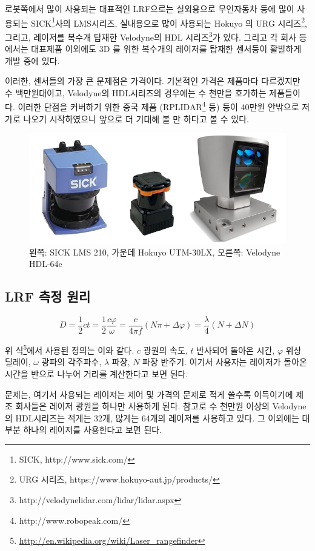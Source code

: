 로봇쪽에서 많이 사용되는 대표적인 LRF으로는 실외용으로 무인자동차 등에 많이 사용되는 SICK\footnote{SICK, http://www.sick.com/}사의 LMS시리즈, 실내용으로 많이 사용되는 Hokuyo 의 URG 시리즈\footnote{URG 시리즈, https://www.hokuyo-aut.jp/products/}, 그리고, 레이저를 복수개 탑재한 Velodyne의 HDL 시리즈\footnote{http://velodynelidar.com/lidar/lidar.aspx}가 있다. 그리고 각 회사 등에서는 대표제품 이외에도 3D 를 위한 복수개의 레이저를 탑재한 센서등이 활발하게 개발 중에 있다.

이러한, 센서들의 가장 큰 문제점은 가격이다. 기본적인 가격은 제품마다 다르겠지만 수 백만원대이고, Velodyne의 HDL시리즈의 경우에는 수 천만을 호가하는 제품들이다. 이러한 단점을 커버하기 위한 중국 제품 (RPLIDAR\footnote{http://www.robopeak.com/} 등) 등이 40만원 안밖으로 저가로 나오기 시작하였으니 앞으로 더 기대해 볼 만 하다고 볼 수 있다.

\begin{figure}[h]
\centering\includegraphics[width=0.7\columnwidth]{pictures/chapter9/sickhokuyovelodyne.png}
\caption{왼쪽: SICK LMS 210, 가운데 Hokuyo UTM-30LX, 오른쪽: Velodyne HDL-64e}
\end{figure}

\subsection{LRF 측정 원리}

\begin{equation}
  D = \frac{1}{2}ct = \frac{1}{2}\frac{c\varphi}{\omega} = \frac{c}{4\pi f}(N\pi +  \Delta\varphi) = \frac{\lambda}{4}(N +  \Delta N)
\end{equation}

위 식\footnote{\url{http://en.wikipedia.org/wiki/Laser_rangefinder}}에서 사용된 정의는 이와 같다. $c$ 광원의 속도, $t$ 반사되어 돌아온 시간, $\varphi$ 위상 딜레이, $\omega$ 광파의 각주파수, $\lambda$ 파장, $N$ 파장 반주기. 여기서 사용자는 레이저가 돌아온 시간을 반으로 나누어 거리를 계산한다고 보면 된다.

문제는, 여기서 사용되는 레이저는 제어 및 가격의 문제로 적게 쓸수록 이득이기에 제조 회사들은 레이저 광원을 하나만 사용하게 된다. 참고로 수 천만원 이상의 Velodyne의 HDL시리즈는 적게는 32개, 많게는 64개의 레이저를 사용하고 있다. 그 이외에는 대부분 하나의 레이저를 사용한다고 보면 된다. 

